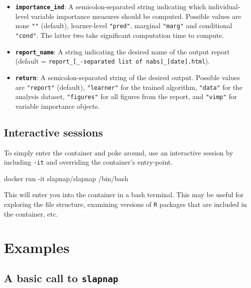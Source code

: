 \documentclass[]{article}
\newenvironment{Shaded}{\begin{snugshade}}{\end{snugshade}}
\newcommand{\ExtensionTok}[1]{#1}
\newcommand{\NormalTok}[1]{#1}
\begin{document}
\begin{itemize}
\item
  \textbf{\texttt{importance\_ind}}: A semicolon-separated string indicating which individual-level variable importance measures should be computed. Possible values are none \texttt{""} (default), learner-level \texttt{"pred"}, marginal \texttt{"marg"} and conditional \texttt{"cond"}. The latter two take significant computation time to compute.
\item
  \textbf{\texttt{report\_name}}: A string indicating the desired name of the output report (default = \texttt{report\_{[}\_-separated\ list\ of\ nabs{]}\_{[}date{]}.html}).
\item
  \textbf{\texttt{return}}: A semicolon-separated string of the desired output. Possible values are \texttt{"report"} (default), \texttt{"learner"} for the trained algorithm, \texttt{"data"} for the analysis dataset, \texttt{"figures"} for all figures from the report, and \texttt{"vimp"} for variable importance objects.
\end{itemize}

\hypertarget{interactive-sessions}{%
\subsection{Interactive sessions}\label{interactive-sessions}}

To simply enter the container and poke around, use an interactive session by including \texttt{-it} and overriding the container's entry-point.

\begin{Shaded}
\begin{Highlighting}[]
\ExtensionTok{docker}\NormalTok{ run -it slapnap/slapnap /bin/bash}
\end{Highlighting}
\end{Shaded}

This will enter you into the container in a bash terminal. This may be useful for exploring the file structure, examining versions of \texttt{R} packages that are included in the container, etc.

\hypertarget{sec:examples}{%
\section{Examples}\label{sec:examples}}

\hypertarget{a-basic-call-to-slapnap}{%
\subsection{\texorpdfstring{A basic call to \texttt{slapnap}}{A basic call to slapnap}}\label{a-basic-call-to-slapnap}}
\end{document}
